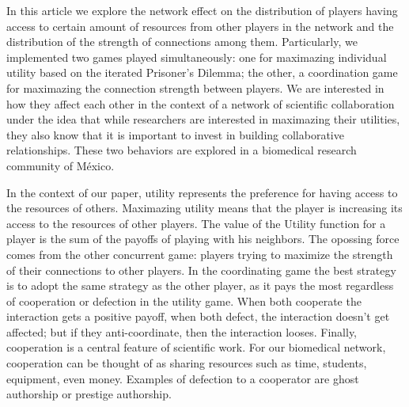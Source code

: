 \documentclass[11pt]{article}
\begin{document}

 {\color{red}In this article we explore the network effect on the distribution
   of players having access to certain amount of resources from other players in the
   network and the distribution of the strength of connections among
   them. Particularly, we implemented two games played simultaneously: 
   one for maximazing individual utility based on the iterated Prisoner's
   Dilemma; the other, a coordination game for maximazing the connection strength between
   players. We are interested in how they affect each other in 
   the context of a network of scientific collaboration under the idea that while
   researchers are interested in maximazing their utilities, they also know that
   it is important to invest in building collaborative relationships. These two
   behaviors are explored in a biomedical research community of M\'exico.}\\    

{\color{red}In the context of our paper, utility represents
  the preference for having access to the resources of others. Maximazing
  utility means that the player is increasing its access to the resources of
  other players. The value of the Utility function for a player is the sum of the payoffs of playing
  with his neighbors. The opossing force comes from the other concurrent game: players
  trying to maximize the strength of their connections to other players. In the coordinating game
  the best strategy is to adopt the same strategy as the other player, as it pays the most
  regardless of cooperation or defection in the utility game. When
  both cooperate the interaction gets a positive payoff, when both defect, the
  interaction doesn't get affected; but if they anti-coordinate, then the
  interaction looses. Finally, cooperation is a central feature of scientific work.
  For our biomedical network, cooperation can be thought of
  as sharing resources such as time, students, equipment, even money. Examples of defection
  to a cooperator are ghost authorship or
  prestige authorship.


}
\end{document}
